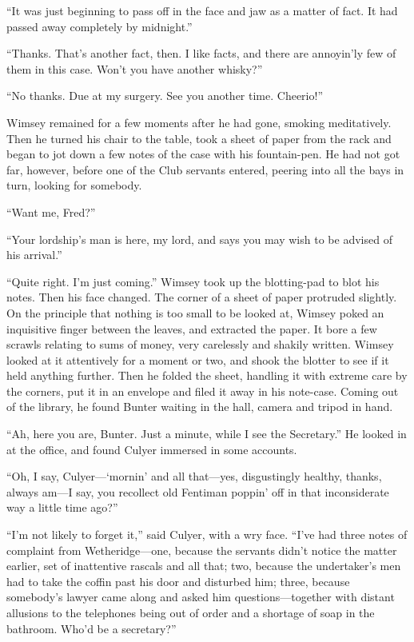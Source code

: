 \enquote{It was just beginning to pass off in the face and jaw as a matter of fact. It had passed away completely by midnight.}

\enquote{Thanks. That's another fact, then. I like facts, and there are annoyin'ly few of them in this case. Won't you have another whisky?}

\enquote{No thanks. Due at my surgery. See you another time. Cheerio!}

Wimsey remained for a few moments after he had gone, smoking meditatively. Then he turned his chair to the table, took a sheet of paper from the rack and began to jot down a few notes of the case with his fountain-pen. He had not got far, however, before one of the Club servants entered, peering into all the bays in turn, looking for somebody.

\enquote{Want me, Fred?}

\enquote{Your lordship's man is here, my lord, and says you may wish to be advised of his arrival.}

\enquote{Quite right. I'm just coming.} Wimsey took up the blotting-pad to blot his notes. Then his face changed. The corner of a sheet of paper protruded slightly. On the principle that nothing is too small to be looked at, Wimsey poked an inquisitive finger between the leaves, and extracted the paper. It bore a few scrawls relating to sums of money, very carelessly and shakily written. Wimsey looked at it attentively for a moment or two, and shook the blotter to see if it held anything further. Then he folded the sheet, handling it with extreme care by the corners, put it in an envelope and filed it away in his note-case. Coming out of the library, he found Bunter waiting in the hall, camera and tripod in hand.

\enquote{Ah, here you are, Bunter. Just a minute, while I see the Secretary.} He looked in at the office, and found Culyer immersed in some accounts.

\enquote{Oh, I say, Culyer---\enquote{mornin} and all that\allowbreak---\allowbreak yes, disgustingly healthy, thanks, always am\allowbreak---\allowbreak I say, you recollect old Fentiman poppin' off in that inconsiderate way a little time ago?}

\enquote{I'm not likely to forget it,} said Culyer, with a wry face. \enquote{I've had three notes of complaint from Wetheridge\allowbreak---\allowbreak one, because the servants didn't notice the matter earlier, set of inattentive rascals and all that; two, because the undertaker's men had to take the coffin past his door and disturbed him; three, because somebody's lawyer came along and asked him questions\allowbreak---\allowbreak together with distant allusions to the telephones being out of order and a shortage of soap in the bathroom. Who'd be a secretary?}

